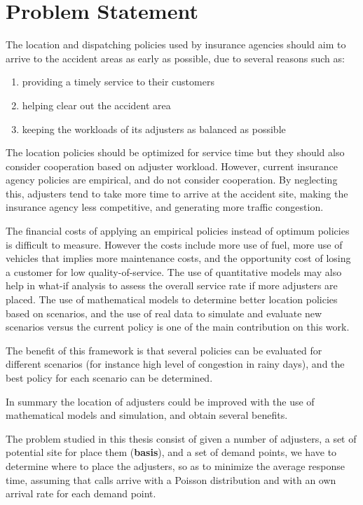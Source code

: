 \section{Problem Statement}

The location and dispatching policies
used by insurance agencies
should aim
to arrive to the accident areas
as early as possible,
due to several reasons
such as:
\begin{enumerate}
\item providing a timely service to their customers
\item helping clear out the accident area
\item keeping the workloads of its adjusters
  as balanced as possible
\end{enumerate}
The location policies
should be optimized for service time
but they should also consider
cooperation based on adjuster workload.
However,
current insurance agency policies
are empirical,
and do not consider cooperation.
By neglecting this,
adjusters tend to take
more time to arrive at the accident site,
making the insurance agency
less competitive,
and generating more traffic congestion.

The financial costs
of applying
an empirical policies
instead of optimum policies
is difficult to measure.
However the costs include
more use of fuel,
more use of vehicles
that implies
more maintenance costs,
and the opportunity cost
of losing a customer
for low quality-of-service.
The use of quantitative models
may also help
in what-if analysis
to assess the overall service rate
if more adjusters are placed.
The use of mathematical models
to determine better location policies
based on scenarios,
and the use of real data
to simulate and evaluate new scenarios
versus the current policy
is one of the main contribution
on this work.

The benefit of this framework
is that several policies
can be evaluated for different scenarios
(for instance high level of congestion in rainy days),
and the best policy for each scenario can be determined.

In summary
the location of adjusters
could be improved
with the use of
mathematical models and simulation,
and obtain several benefits.

The problem studied in this thesis
consist of
given a number of adjusters,
a set of potential site for place them (\textbf{basis}),
and a set of demand points,
we have to determine
where to place the adjusters,
so as to minimize 
the average response time,
assuming
that calls
arrive with a Poisson distribution
and with an own arrival rate
for each demand point.
